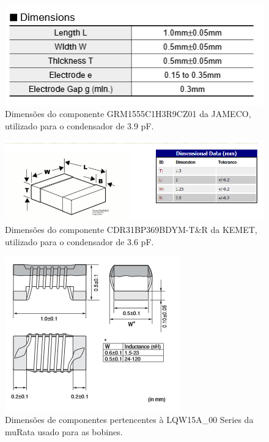 \documentclass[11pt]{article}
\numberwithin{equation}{section}
\begin{document}
\begin{figure}[H]
\centering
\includegraphics[keepaspectratio=true, scale=0.45]{teoricas/3_9pF}
\vspace{-0.5em}
\caption{Dimensões do componente GRM1555C1H3R9CZ01 da JAMECO, utilizado para o condensador de 3.9 pF.}
\vspace{-0.8em}
\label{fig:C_3_9}
\end{figure}

\begin{figure}[H]
\centering
\includegraphics[keepaspectratio=true, scale=0.45]{teoricas/3_6pF}
\vspace{-0.5em}
\caption{Dimensões do componente CDR31BP369BDYM-T\&R da KEMET, utilizado para o condensador de 3.6 pF.}
\vspace{-0.8em}
\label{fig:C_3_6}
\end{figure}

\begin{figure}[h]
\centering
\includegraphics[keepaspectratio=true, scale=0.45]{teoricas/bobines}
\vspace{-0.5em}
\caption{Dimensões de componentes pertencentes à LQW15A\_00 Series da muRata usado para as bobines.}
\vspace{-0.8em}
\label{fig:bobines}
\end{figure}
\end{document}
